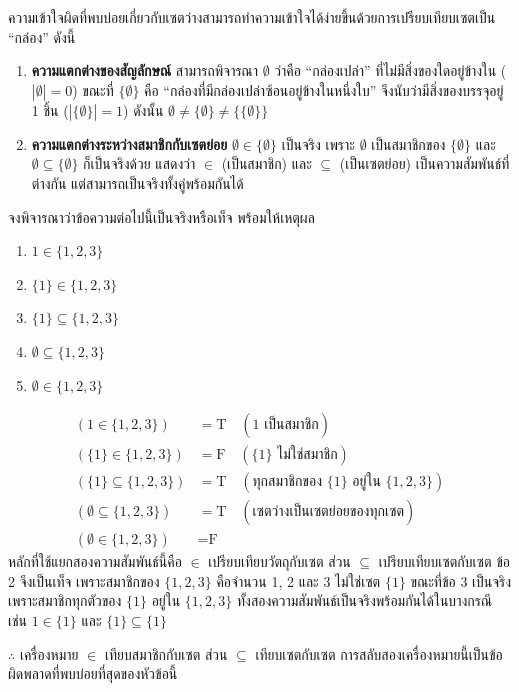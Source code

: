 \begin{rem}
ความเข้าใจผิดที่พบบ่อยเกี่ยวกับเซตว่างสามารถทำความเข้าใจได้ง่ายขึ้นด้วยการเปรียบเทียบเซตเป็น ``กล่อง'' ดังนี้
\begin{enumerate}[label=\textbf{\arabic*.},leftmargin=1.5em,itemsep=0.3em]
    \item \textbf{ความแตกต่างของสัญลักษณ์} สามารถพิจารณา $\emptyset$ ว่าคือ ``กล่องเปล่า'' ที่ไม่มีสิ่งของใดอยู่ข้างใน ($|\emptyset| = 0$) ขณะที่ $\{\emptyset\}$ คือ ``กล่องที่มีกล่องเปล่าซ้อนอยู่ข้างในหนึ่งใบ'' จึงนับว่ามีสิ่งของบรรจุอยู่ 1 ชิ้น ($|\{\emptyset\}| = 1$) ดังนั้น $\emptyset \neq \{\emptyset\} \neq \{\{\emptyset\}\}$
    \item \textbf{ความแตกต่างระหว่างสมาชิกกับเซตย่อย} $\emptyset \in \{\emptyset\}$ เป็นจริง เพราะ $\emptyset$ เป็นสมาชิกของ $\{\emptyset\}$ และ $\emptyset \subseteq \{\emptyset\}$ ก็เป็นจริงด้วย แสดงว่า $\in$ (เป็นสมาชิก) และ $\subseteq$ (เป็นเซตย่อย) เป็นความสัมพันธ์ที่ต่างกัน แต่สามารถเป็นจริงทั้งคู่พร้อมกันได้
\end{enumerate}
\end{rem}

\begin{ex}
\label{ex:member-vs-subset}
จงพิจารณาว่าข้อความต่อไปนี้เป็นจริงหรือเท็จ พร้อมให้เหตุผล
\begin{enumerate}
    \item $1 \in \{1, 2, 3\}$
    \item $\{1\} \in \{1, 2, 3\}$
    \item $\{1\} \subseteq \{1, 2, 3\}$
    \item $\emptyset \subseteq \{1, 2, 3\}$
    \item $\emptyset \in \{1, 2, 3\}$
\end{enumerate}
\end{ex}
\begin{solution}
\begin{align*}
(1 \in \{1,2,3\}) &= \text{T} \quad (1 \text{ เป็นสมาชิก})\\
(\{1\} \in \{1,2,3\}) &= \text{F} \quad (\{1\} \text{ ไม่ใช่สมาชิก})\\
(\{1\} \subseteq \{1,2,3\}) &= \text{T} \quad (\text{ทุกสมาชิกของ } \{1\} \text{ อยู่ใน } \{1,2,3\})\\
(\emptyset \subseteq \{1,2,3\}) &= \text{T} \quad (\text{เซตว่างเป็นเซตย่อยของทุกเซต})\\
(\emptyset \in \{1,2,3\}) &= \text{F}
\end{align*}
หลักที่ใช้แยกสองความสัมพันธ์นี้คือ $\in$ เปรียบเทียบวัตถุกับเซต ส่วน $\subseteq$ เปรียบเทียบเซตกับเซต ข้อ 2 จึงเป็นเท็จ เพราะสมาชิกของ $\{1,2,3\}$ คือจำนวน 1, 2 และ 3 ไม่ใช่เซต $\{1\}$ ขณะที่ข้อ 3 เป็นจริงเพราะสมาชิกทุกตัวของ $\{1\}$ อยู่ใน $\{1,2,3\}$ ทั้งสองความสัมพันธ์เป็นจริงพร้อมกันได้ในบางกรณี เช่น $1 \in \{1\}$ และ $\{1\} \subseteq \{1\}$

$\therefore$ เครื่องหมาย $\in$ เทียบสมาชิกกับเซต ส่วน $\subseteq$ เทียบเซตกับเซต การสลับสองเครื่องหมายนี้เป็นข้อผิดพลาดที่พบบ่อยที่สุดของหัวข้อนี้ \solhere
\end{solution}


